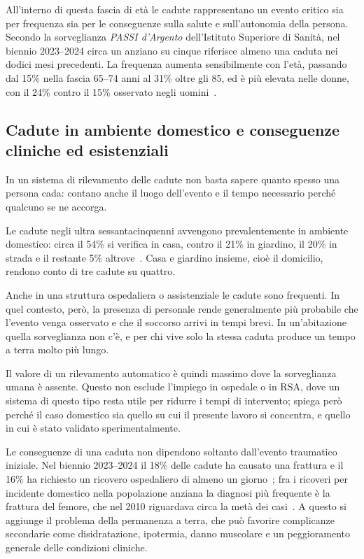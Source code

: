 All'interno di questa fascia di età le cadute rappresentano un evento critico
sia per frequenza sia per le conseguenze sulla salute e sull'autonomia della
persona. Secondo la sorveglianza \emph{PASSI d'Argento} dell'Istituto
Superiore di Sanità, nel biennio 2023--2024 circa un anziano su cinque
riferisce almeno una caduta nei dodici mesi precedenti. La frequenza aumenta
sensibilmente con l'età, passando dal 15\% nella fascia 65--74 anni al 31\%
oltre gli 85, ed è più elevata nelle donne, con il 24\% contro il 15\%
osservato negli uomini~\cite{passi}.

\subsection*{Cadute in ambiente domestico e conseguenze cliniche ed esistenziali}

In un sistema di rilevamento delle cadute non basta sapere quanto spesso una
persona cada: contano anche il luogo dell'evento e il tempo necessario perché
qualcuno se ne accorga.

Le cadute negli ultra sessantacinquenni avvengono prevalentemente in ambiente
domestico: circa il 54\% si verifica in casa, contro il 21\% in giardino, il
20\% in strada e il restante 5\% altrove~\cite{passi}. Casa e giardino
insieme, cioè il domicilio, rendono conto di tre cadute su quattro.

Anche in una struttura ospedaliera o assistenziale le cadute sono frequenti.
In quel contesto, però, la presenza di personale rende generalmente più
probabile che l'evento venga osservato e che il soccorso arrivi in tempi
brevi. In un'abitazione quella sorveglianza non c'è, e per chi vive solo la
stessa caduta produce un tempo a terra molto più lungo.

Il valore di un rilevamento automatico è quindi massimo dove la sorveglianza
umana è assente. Questo non esclude l'impiego in ospedale o in RSA, dove un
sistema di questo tipo resta utile per ridurre i tempi di intervento; spiega
però perché il caso domestico sia quello su cui il presente lavoro si
concentra, e quello in cui è stato validato sperimentalmente.

Le conseguenze di una caduta non dipendono soltanto dall'evento traumatico
iniziale. Nel biennio 2023--2024 il 18\% delle cadute ha causato una frattura
e il 16\% ha richiesto un ricovero ospedaliero di almeno un
giorno~\cite{passi}; fra i ricoveri per incidente domestico nella popolazione
anziana la diagnosi più frequente è la frattura del femore, che nel 2010
riguardava circa la metà dei casi~\cite{epicentro}. A questo si aggiunge il
problema della permanenza a terra, che può favorire complicanze secondarie
come disidratazione, ipotermia, danno muscolare e un peggioramento generale
delle condizioni cliniche.

